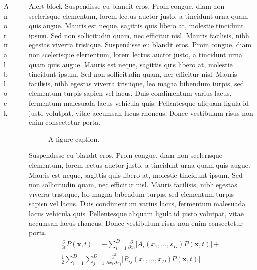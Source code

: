 \documentclass[final]{beamer}
\newlength{\sepwidth}
\newlength{\colwidth}
\newcommand{\separatorcolumn}{\begin{column}{\sepwidth}\end{column}}
\begin{document}
\begin{frame}[t]
\begin{columns}[t]
\begin{column}{\colwidth}
\begin{block}{A normal block}
  \end{block}


\end{column}

\separatorcolumn

\begin{column}{\colwidth}

  \begin{alertblock}{Alert block}
  Suspendisse eu blandit eros. Proin congue, diam non scelerisque elementum, lorem lectus auctor justo, a tincidunt urna quam quis augue. Mauris est neque, sagittis quis libero at, molestie tincidunt ipsum. Sed non sollicitudin quam, nec efficitur nisl. Mauris facilisis, nibh egestas viverra tristique.
  Suspendisse eu blandit eros. Proin congue, diam non scelerisque elementum, lorem lectus auctor justo, a tincidunt urna quam quis augue. Mauris est neque, sagittis quis libero at, molestie tincidunt ipsum. Sed non sollicitudin quam, nec efficitur nisl. Mauris facilisis, nibh egestas viverra tristique, leo magna bibendum turpis, sed elementum turpis sapien vel lacus. Duis condimentum varius lacus, fermentum malesuada lacus vehicula quis. Pellentesque aliquam ligula id justo volutpat, vitae accumsan lacus rhoncus. Donec vestibulum risus non enim consectetur porta. 
  
     \begin{figure}
      \centering
      \caption{A figure caption.}
    \end{figure}

Suspendisse eu blandit eros. Proin congue, diam non scelerisque elementum, lorem lectus auctor justo, a tincidunt urna quam quis augue. Mauris est neque, sagittis quis libero at, molestie tincidunt ipsum. Sed non sollicitudin quam, nec efficitur nisl. Mauris facilisis, nibh egestas viverra tristique, leo magna bibendum turpis, sed elementum turpis sapien vel lacus. Duis condimentum varius lacus, fermentum malesuada lacus vehicula quis. Pellentesque aliquam ligula id justo volutpat, vitae accumsan lacus rhoncus. Donec vestibulum risus non enim consectetur porta. 
\begin{align*}
    \frac{\partial}{\partial t} P(\mathbf{x},t) = -\sum_{i=1}^{D} \frac{\partial}{\partial x_i} \Big[ A_i(x_1, \ldots, x_D) P(\mathbf{x},t) \Big] + \\
    \frac{1}{2} \sum_{i=1}^{D} \sum_{j=1}^{D} \frac{\partial^2}{\partial x_i \, \partial x_j} \Big[ B_{ij}(x_1, \ldots, x_D) P(\mathbf{x},t) \Big]
\end{align*}


\end{alertblock}
\end{column}
\end{columns}
\end{frame}
\end{document}

